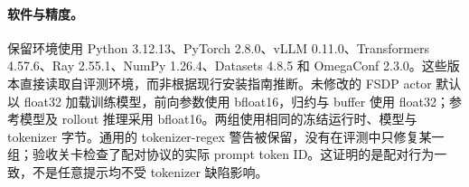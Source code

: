 \paragraph{软件与精度。}
保留环境使用 Python 3.12.13、PyTorch 2.8.0、vLLM 0.11.0、Transformers 4.57.6、Ray 2.55.1、NumPy 1.26.4、Datasets 4.8.5 和 OmegaConf 2.3.0。这些版本直接读取自评测环境，而非根据现行安装指南推断。未修改的 FSDP actor 默认以 float32 加载训练模型，前向参数使用 bfloat16，归约与 buffer 使用 float32；参考模型及 rollout 推理采用 bfloat16。两组使用相同的冻结运行时、模型与 tokenizer 字节。通用的 tokenizer-regex 警告被保留，没有在评测中只修复某一组；验收关卡检查了配对协议的实际 prompt token ID。这证明的是配对行为一致，不是任意提示均不受 tokenizer 缺陷影响。
